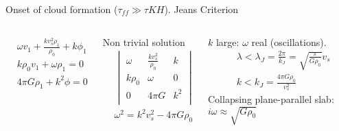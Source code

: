 \begin{frame}{Onset of cloud formation ($\tau_{ff}\gg\tau{KH}$). Jeans Criterion}
\begin{columns}[T]
	\begin{column}{0.3\textwidth}
		\begin{align*}
		&\omega v_1+\frac{kv_s^2\rho_1}{\rho_0}+k\phi_1=0\\
		&k\rho_0v_1+\omega\rho_1=0\\
		&4\pi G\rho_1+k^2\phi=0
		\end{align*}
	\end{column}
	\begin{column}{0.3\textwidth}
Non trivial solution
		\begin{align*}
		&\begin{vmatrix}
            \omega&\frac{kv_s^2}{\rho_0}&k\\
		k\rho_0&\omega&0\\
		0&4\pi G&k^2\\
		\end{vmatrix}=0\\
		&\omega^2=k^2v_s^2-4\pi G\rho_0
		\end{align*}
	\end{column}
	\begin{column}{0.4\textwidth}
$k$ large: $\omega$ real (oscillations). 
\begin{align*}
    &\lambda<\lambda_J=\frac{2\pi}{k_J}=\sqrt{\frac{\pi}{G\rho_0}}v_s\tag{Stable}\\
    &k<k_J=\frac{4\pi G\rho_0}{v_s^2}\tag{Unstable}
\end{align*}
Collapsing plane-parallel slab: $i\omega\approx\sqrt{G\rho_0}$
\end{column}
\end{columns}
\end{frame}

